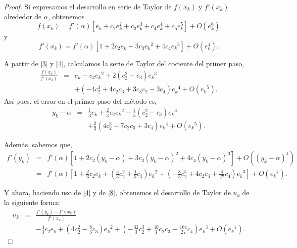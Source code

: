\begin{proof}\label{demostracion1}
	Si expresamos el desarrollo en serie de Taylor de $f(x_k)$ y $f'(x_k)$ alrededor de $\alpha$, obtenemos
	\begin{equation}\label{3}
	f(x_k) = f'(\alpha )\left[e_k + c_2 e_k^2 + c_3 e_k^3 + c_4 e_k^4 + c_5 e_k^5\right] + O(e_k^6)
	\end{equation}
	y
	\begin{equation}\label{4}
	f'(x_k) = f'(\alpha )\left[1 + 2{c_2}{e_k} + 3{c_3}{e_k}^2 + 4{c_4}{e_k}^3 \right] + O(e_k^4).
	\end{equation}
	
	A partir de \eqref{3} y \eqref{4}, calculamos la serie de Taylor del cociente del primer paso,
	\begin{eqnarray*}
		\frac{f(x_k)}{f'(x_k)} &=& {e_k} - {c_2}{e_k}^2 + 2(c_2^2 - {c_3}){e_k}^3 \\
		& & + ( - 4c_2^3 + 4{c_2}{c_3} + 3{c_3}{c_2} - 3{c_4}){e_k}^4+ O({e_k}^5).
	\end{eqnarray*}
	Así pues, el error en el primer paso del método es,
	\begin{eqnarray*}\label{7}
		y_k - \alpha &=& \frac{1}{3}{e_k} + \frac{2}{3}{c_2}{e_k}^2 - \frac{4}{3}(c_2^2 - {c_3}){e_k}^3 \\
		& & + \frac{2}{3}(4c_2^3 - 7{c_2}{c_3} + 3{c_4}){e_k}^4+ O({e_k}^5).\nonumber
	\end{eqnarray*}
	
	Además, sabemos que,
	\begin{eqnarray}\label{8}
	f'({y_k}) &=& f'(\alpha )\left[ 1 + 2{c_2}({y_k} - \alpha ) + 3{c_3}{({y_k} - \alpha )^2} + 4{c_4}{({y_k} - \alpha )^3}\right] + O({({y_k} - \alpha )^4})\\
	&=& f'(\alpha )\left[ 1 + \frac{2}{3}{c_2}{e_k} +\left( \frac{4}{3}c_2^2 + \frac{1}{3}{c_3}\right){e_k}^2 + \left( - \frac{8}{3}c_2^3 + 4{c_2}{c_3} + \frac{4}{{27}}{c_4}\right){e_k}^3 \right] + O({e_k}^4).\nonumber
	\end{eqnarray}
	
	Y ahora, haciendo uso de \eqref{4} y de
	\eqref{8}, obtenemos el desarrollo de Taylor de $u_k$ de la siguiente forma:
	\begin{eqnarray*}\label{10}
		u_k&=&\frac{f'(y_k)-f'(x_k)}{f'(x_k)}\\
		& =&- \frac{4}{3}{c_2}{e_k} + \left(4c_2^2 - \frac{8}{3}{c_3}\right){e_k}^2 + \left(- \frac{{32}}{3}c_2^3 + \frac{40}{3}{c_2}{c_3} - \frac{{104}}{{27}}{c_4}\right){e_k}^3 + O({e_k}^4).\nonumber
	\end{eqnarray*}
	

\end{proof}
